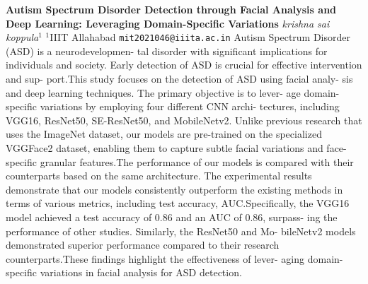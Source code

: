 
    \begin{conf-abstract}[]
        {\textbf{Autism Spectrum Disorder Detection through Facial Analysis and Deep Learning: Leveraging Domain-Specific Variations}}
        {\textit{krishna sai koppula$^{1}$}}
        {$^{1}$IIIT Allahabad}
        {\texttt{mit2021046@iiita.ac.in}}
        { Autism Spectrum Disorder (ASD) is a neurodevelopmen- tal disorder with significant implications for individuals and society. Early detection of ASD is crucial for effective intervention and sup- port.This study focuses on the detection of ASD using facial analy- sis and deep learning techniques. The primary objective is to lever- age domain-specific variations by employing four different CNN archi- tectures, including VGG16, ResNet50, SE-ResNet50, and MobileNetv2. Unlike previous research that uses the ImageNet dataset, our models are pre-trained on the specialized VGGFace2 dataset, enabling them to capture subtle facial variations and face-specific granular features.The performance of our models is compared with their counterparts based on the same architecture. The experimental results demonstrate that our models consistently outperform the existing methods in terms of various metrics, including test accuracy, AUC.Specifically, the VGG16 model achieved a test accuracy of 0.86 and an AUC of 0.86, surpass- ing the performance of other studies. Similarly, the ResNet50 and Mo- bileNetv2 models demonstrated superior performance compared to their research counterparts.These findings highlight the effectiveness of lever- aging domain-specific variations in facial analysis for ASD detection.}
    \end{conf-abstract}
        